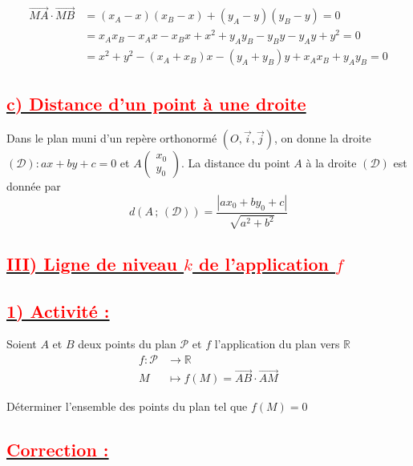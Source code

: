 \documentclass[12pt,a4paper]{article}
\begin{document}
\begin{align*}
\overrightarrow{MA} \cdot \overrightarrow{MB} &= (x_A - x)(x_B - x) + (y_A - y)(y_B - y) = 0 \\
&= x_A x_B - x_A x - x_B x + x^2 + y_A y_B - y_B y - y_A y + y^2 = 0 \\
&= x^2 + y^2 - (x_A + x_B)x - (y_A + y_B)y + x_A x_B + y_A y_B = 0
\end{align*}

\subsection*{\underline{\textbf{\textcolor{red}{c) Distance d'un point à une droite}}}}

Dans le plan muni d'un repère orthonormé $(O, \vec{i}, \vec{j})$, on donne la droite $(\mathcal{D}) : ax + by + c = 0$ et $A\begin{pmatrix} x_0 \\ y_0 \end{pmatrix}$. La distance du point $A$ à la droite $(\mathcal{D})$ est donnée par
\[
d(A\,;\, (\mathcal{D})) = \frac{|a x_0 + b y_0 + c|}{\sqrt{a^2 + b^2}}
\]

\subsection*{\underline{\textbf{\textcolor{red}{III) Ligne de niveau $k$ de l'application $f$}}}}

\subsection*{\underline{\textbf{\textcolor{red}{1) Activité :}}}}

Soient $A$ et $B$ deux points du plan $\mathcal{P}$ et $f$ l'application du plan vers $\mathbb{R}$
\begin{align*}
f : \mathcal{P} &\longrightarrow \mathbb{R} \\
M &\longmapsto f(M) = \overrightarrow{AB} \cdot \overrightarrow{AM}
\end{align*}

Déterminer l'ensemble des points du plan tel que $f(M) = 0$

\vspace{0.3cm}

\subsection*{\underline{\textbf{\textcolor{red}{Correction :}}}}
\end{document}
